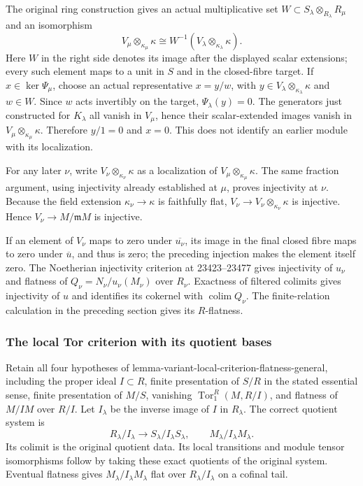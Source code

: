 The original ring construction gives an actual multiplicative set \(W\subset S_\lambda\otimes_{R_\lambda}R_\mu\) and an isomorphism \[
V_\mu\otimes_{\kappa_\mu}\kappa
 \cong W^{-1}(V_\lambda\otimes_{\kappa_\lambda}\kappa).
\] Here \(W\) in the right side denotes its image after the displayed scalar extensions; every such element maps to a unit in \(S\) and in the closed-fibre target. If \(x\in\ker\Psi_\mu\), choose an actual representative \(x=y/w\), with \(y\in V_\lambda\otimes_{\kappa_\lambda}\kappa\) and \(w\in W\). Since \(w\) acts invertibly on the target, \(\Psi_\lambda(y)=0\). The generators just constructed for \(K_\lambda\) all vanish in \(V_\mu\), hence their scalar-extended images vanish in \(V_\mu\otimes_{\kappa_\mu}\kappa\). Therefore \(y/1=0\) and \(x=0\). This does not identify an earlier module with its localization.

For any later \(\nu\), write \(V_\nu\otimes_{\kappa_\nu}\kappa\) as a localization of \(V_\mu\otimes_{\kappa_\mu}\kappa\). The same fraction argument, using injectivity already established at \(\mu\), proves injectivity at \(\nu\). Because the field extension \(\kappa_\nu\to\kappa\) is faithfully flat, \(V_\nu\to V_\nu\otimes_{\kappa_\nu}\kappa\) is injective. Hence \(V_\nu\to M/\mathfrak mM\) is injective.

If an element of \(V_\nu\) maps to zero under \(\overline{u_\nu}\), its image in the final closed fibre maps to zero under \(\overline u\), and thus is zero; the preceding injection makes the element itself zero. The Noetherian injectivity criterion at 23423--23477 gives injectivity of \(u_\nu\) and flatness of \(Q_\nu=N_\nu/u_\nu(M_\nu)\) over \(R_\nu\). Exactness of filtered colimits gives injectivity of \(u\) and identifies its cokernel with \(\operatorname{colim}Q_\nu\). The finite-relation calculation in the preceding section gives its \(R\)-flatness.

\subsubsection{The local Tor criterion with its quotient bases}\label{algebra-proof-038-the-local-tor-criterion-with-its-quotient-bases}

Retain all four hypotheses of lemma-\AlgebraIdentifierBreak{}variant-\AlgebraIdentifierBreak{}local-\AlgebraIdentifierBreak{}criterion-\AlgebraIdentifierBreak{}flatness-\AlgebraIdentifierBreak{}general, including the proper ideal \(I\subset R\), finite presentation of \(S/R\) in the stated essential sense, finite presentation of \(M/S\), vanishing \(\operatorname{Tor}_1^R(M,R/I)\), and flatness of \(M/IM\) over \(R/I\). Let \(I_\lambda\) be the inverse image of \(I\) in \(R_\lambda\). The correct quotient system is \[
R_\lambda/I_\lambda\longrightarrow S_\lambda/I_\lambda S_\lambda,
\qquad M_\lambda/I_\lambda M_\lambda.
\] Its colimit is the original quotient data. Its local transitions and module tensor isomorphisms follow by taking these exact quotients of the original system. Eventual flatness gives \(M_\lambda/I_\lambda M_\lambda\) flat over \(R_\lambda/I_\lambda\) on a cofinal tail.

